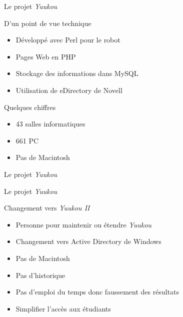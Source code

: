 
\begin{frame}{Le projet \textit{Yuukou}}
	\begin{block}{D'un point de vue technique}
		\begin{itemize}
			\item D\'evelopp\'e avec Perl pour le robot
			\item Pages Web en PHP
			\item Stockage des informations dans MySQL
			\item Utilisation de eDirectory de Novell
			
		\end{itemize}
		
	\end{block}
	
	\begin{block}{Quelques chiffres}
		\begin{itemize}
			\item 43 salles informatiques
			\item 661 PC
			\item Pas de Macintosh
			
		\end{itemize}
		
	\end{block}
	
\end{frame}


\begin{frame}{Le projet \textit{Yuukou}}
	\begin{figure}[h]
		\centering
			
	\end{figure}
	
\end{frame}


\begin{frame}{Le projet \textit{Yuukou}}
	\begin{block}{Changement vers \textit{Yuukou II}}
		\begin{itemize}
			\item Personne pour maintenir ou \'etendre \textit{Yuukou}
			\item Changement vers Active Directory de Windows
			\item Pas de Macintosh
			\item Pas d'historique
			\item Pas d'emploi du temps donc faussement des r\'esultats
			\item Simplifier l'acc\`es aux \'etudiants
			
		\end{itemize}
		
	\end{block}
	
\end{frame}

